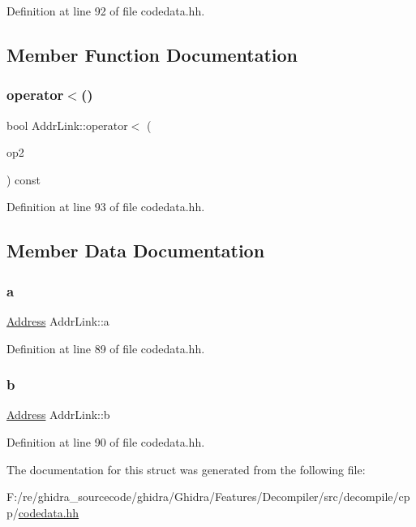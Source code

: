 Definition at line 92 of file codedata.\+hh.



\subsection{Member Function Documentation}
\mbox{\label{struct_addr_link_a4852a9dac537d11998b55bfa01261552}} 
\subsubsection{\texorpdfstring{operator$<$()}{operator<()}}
{\footnotesize\ttfamily bool Addr\+Link\+::operator$<$ (\begin{DoxyParamCaption}\item[{const \mbox{\hyperlink{struct_addr_link}{Addr\+Link}} \&}]{op2 }\end{DoxyParamCaption}) const\hspace{0.3cm}{\ttfamily [inline]}}



Definition at line 93 of file codedata.\+hh.



\subsection{Member Data Documentation}
\mbox{\label{struct_addr_link_a6ec67c67d0ffaad063b5513686591a31}} 
\subsubsection{\texorpdfstring{a}{a}}
{\footnotesize\ttfamily \mbox{\hyperlink{class_address}{Address}} Addr\+Link\+::a}



Definition at line 89 of file codedata.\+hh.

\mbox{\label{struct_addr_link_a1489f3ae0ae7b38b92fdfaac31285a41}} 
\subsubsection{\texorpdfstring{b}{b}}
{\footnotesize\ttfamily \mbox{\hyperlink{class_address}{Address}} Addr\+Link\+::b}



Definition at line 90 of file codedata.\+hh.



The documentation for this struct was generated from the following file\+:\begin{DoxyCompactItemize}
\item 
F\+:/re/ghidra\+\_\+sourcecode/ghidra/\+Ghidra/\+Features/\+Decompiler/src/decompile/cpp/\mbox{\hyperlink{codedata_8hh}{codedata.\+hh}}\end{DoxyCompactItemize}
